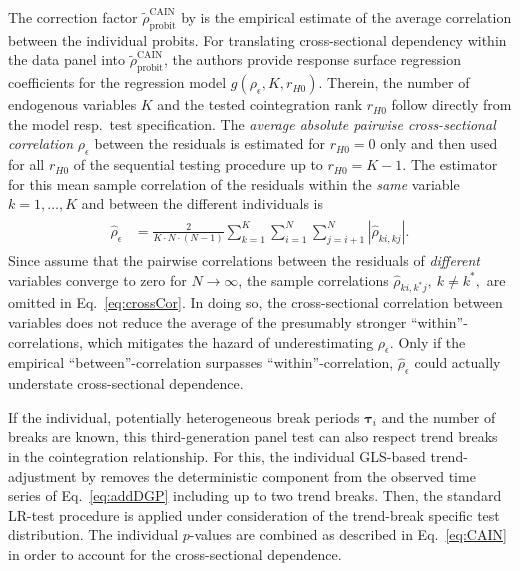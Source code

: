 The correction factor $ \tilde{\rho}^{\text{CAIN}}_\text{probit} $ by \citet{ArsovaOersal2020} is the empirical estimate of the average correlation between the individual probits. For translating cross-sectional dependency within the data panel into $ \tilde{\rho}^{\text{CAIN}}_\text{probit} $, the authors provide response surface regression coefficients for the regression model $ g\left( \rho_\epsilon, K, r_{H0} \right) $. Therein, the number of endogenous variables $ K $ and the tested cointegration rank $ r_{H0} $ follow directly from the model resp.~test specification. The \textit{average absolute pairwise cross-sectional correlation} $ \rho_\epsilon $ between the residuals is estimated for $ r_{H0} = 0 $ only and then used for all $ r_{H0} $ of the sequential testing procedure up to $ r_{H0} = K-1 $. The estimator for this mean sample correlation of the residuals within the \textit{same} variable $ k=1,\ldots,K $ and between the different individuals is
\begin{align} \label{eq:crossCor}
\begin{split}
	\hat{\rho}_\epsilon & = \frac{2}{K \cdot N \cdot (N-1)} \sum_{k=1}^{K} \sum_{i=1}^{N} \sum_{j=i+1}^{N} | \hat{\rho}_{ki,kj} |. 
\end{split}
\end{align}
Since \citet{ArsovaOersal2020} assume that the pairwise correlations between the residuals of \textit{different} variables converge to zero for $ N \to \infty $, the sample correlations $ \hat{\rho}_{ki,k^*j}, \ k \neq k^*, $ are omitted in Eq.~\eqref{eq:crossCor}. In doing so, the cross-sectional correlation between variables does not reduce the average of the presumably stronger ``within''-correlations, which mitigates the hazard of underestimating $ \rho_\epsilon $. Only if the empirical ``between''-correlation surpasses ``within''-correlation, $ \hat{\rho}_\epsilon $ could actually understate cross-sectional dependence.

If the individual, potentially heterogeneous break periods $ \boldsymbol{\tau}_i $ and the number of breaks are known, this third-generation panel test can also respect trend breaks in the cointegration relationship. For this, the individual GLS-based trend-adjustment by \citet{TrenklerEtAl2008} removes the deterministic component from the observed time series of Eq.~\eqref{eq:addDGP} including up to two trend breaks. Then, the standard LR-test procedure is applied under consideration of the trend-break specific test distribution. The individual $p$-values are combined as described in Eq.~\eqref{eq:CAIN} in order to account for the cross-sectional dependence.



